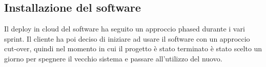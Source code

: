 \documentclass{article}
\begin{document}
  \subsection{Installazione del software}

  Il deploy in cloud del software ha seguito un approccio phased durante i vari sprint. 
    Il cliente ha poi deciso di iniziare ad usare il software con un approccio cut-over, quindi 
    nel momento in cui il progetto è stato terminato è stato scelto un giorno per spegnere il vecchio sistema
    e passare all'utilizzo del nuovo.
\end{document}
